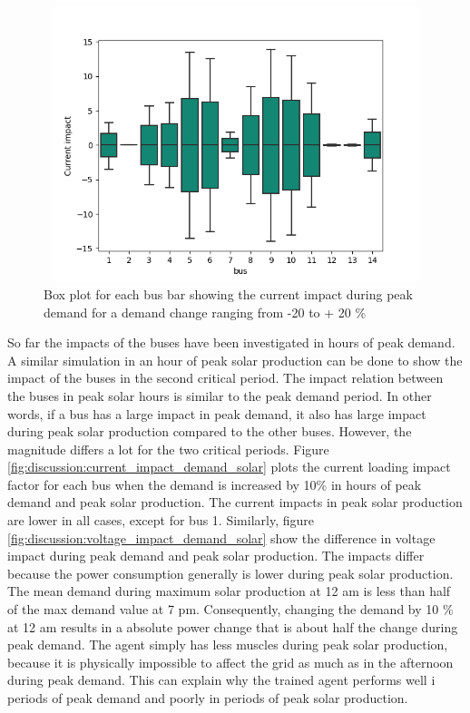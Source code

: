 \documentclass[class=book, crop=false, 11pt]{standalone}
\begin{document}
\begin{figure}[h]
    \center
\includegraphics[height=8cm, width=12cm]{figures/current_impact.png}
    \caption {Box plot for each bus bar showing the current impact during peak demand for a demand change ranging from -20 to + 20 \%}
    \label{fig:discussion:current_impact}
\end{figure}

So far the impacts of the buses have been investigated in hours of peak demand. A similar simulation in an hour of peak solar production can be done to show the impact of the buses in the second critical period. The impact relation between the buses in peak solar hours is similar to the peak demand period. In other words, if a bus has a large impact in peak demand, it also has large impact during peak solar production compared to the other buses. However, the magnitude differs a lot for the two critical periods. Figure \ref{fig:discussion:current_impact_demand_solar} plots the current loading impact factor for each bus when the demand is increased by 10\% in hours of peak demand and peak solar production. The current impacts in peak solar production are lower in all cases, except for bus 1. Similarly, figure     \ref{fig:discussion:voltage_impact_demand_solar} show the difference in voltage impact during peak demand and peak solar production. The impacts differ because the power consumption generally is lower during peak solar production. The mean demand during maximum solar production at 12 am is less than half of the max demand value at 7 pm. Consequently, changing the demand by 10 \% at 12 am results in a absolute power change that is about half the change during peak demand. The agent simply has less muscles during peak solar production, because it is physically impossible to affect the grid as much as in the afternoon during peak demand. This can explain why the trained agent performs well i periods of peak demand and poorly in periods of peak solar production.
\end{document}
